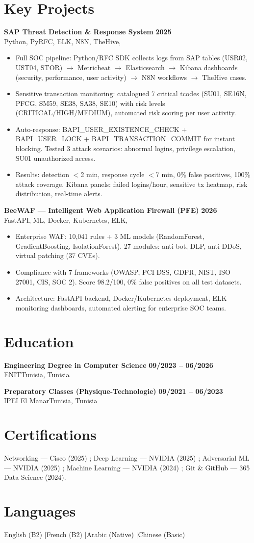 \documentclass[a4paper,10pt]{article}
\newcommand{\cventry}[4]{\textbf{#1} \hfill \textbf{#4}\\[1pt]#2{\ifx\relax#3\relax\else, #3\fi}\par\vspace{1pt}}
\begin{document}
\section{Key Projects}
\cventry{SAP Threat Detection \& Response System}{Python, PyRFC, ELK, N8N, TheHive}{}{2025}
\begin{itemize}
  \item Full SOC pipeline: Python/RFC SDK collects logs from SAP tables (USR02, UST04, STOR) $\rightarrow$ Metricbeat $\rightarrow$ Elasticsearch $\rightarrow$ Kibana dashboards (security, performance, user activity) $\rightarrow$ N8N workflows $\rightarrow$ TheHive cases.
  \item Sensitive transaction monitoring: catalogued 7 critical tcodes (SU01, SE16N, PFCG, SM59, SE38, SA38, SE10) with risk levels (CRITICAL/HIGH/MEDIUM), automated risk scoring per user activity.
  \item Auto-response: BAPI\_USER\_EXISTENCE\_CHECK + BAPI\_USER\_LOCK + BAPI\_TRANSACTION\_COMMIT for instant blocking. Tested 3 attack scenarios: abnormal logins, privilege escalation, SU01 unauthorized access.
  \item Results: detection $<$2 min, response cycle $<$7 min, 0\% false positives, 100\% attack coverage. Kibana panels: failed logins/hour, sensitive tx heatmap, risk distribution, real-time alerts.
\end{itemize}
\cventry{BeeWAF --- Intelligent Web Application Firewall (PFE)}{FastAPI, ML, Docker, Kubernetes, ELK}{}{2026}
\begin{itemize}
  \item Enterprise WAF: 10,041 rules + 3 ML models (RandomForest, GradientBoosting, IsolationForest). 27 modules: anti-bot, DLP, anti-DDoS, virtual patching (37 CVEs).
  \item Compliance with 7 frameworks (OWASP, PCI DSS, GDPR, NIST, ISO 27001, CIS, SOC 2). Score 98.2/100, 0\% false positives on all test datasets.
  \item Architecture: FastAPI backend, Docker/Kubernetes deployment, ELK monitoring dashboards, automated alerting for enterprise SOC teams.
\end{itemize}
\section{Education}
\cventry{Engineering Degree in Computer Science}{ENIT}{Tunisia}{09/2023 -- 06/2026}
\cventry{Preparatory Classes (Physique-Technologie)}{IPEI El Manar}{Tunisia}{09/2021 -- 06/2023}
\section{Certifications}
Networking --- Cisco (2025) ; Deep Learning --- NVIDIA (2025) ; Adversarial ML --- NVIDIA (2025) ; Machine Learning --- NVIDIA (2024) ; Git \& GitHub --- 365 Data Science (2024).
\section{Languages}
English (B2) \quad|\quad French (B2) \quad|\quad Arabic (Native) \quad|\quad Chinese (Basic)
\end{document}
